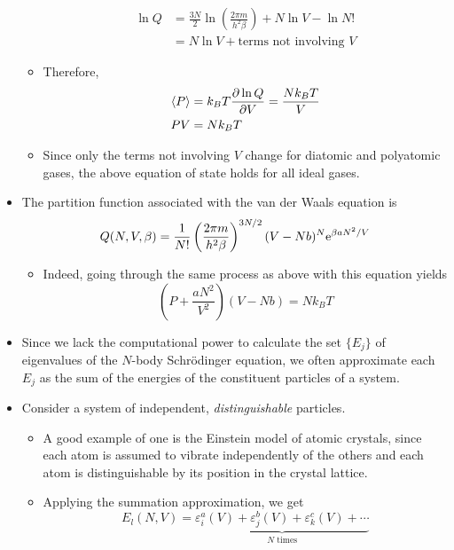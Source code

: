 \documentclass[../notes.tex]{subfiles}
\begin{document}
\begin{itemize}
\begin{itemize}
        \begin{align*}
            \ln Q &= \frac{3N}{2}\ln\left( \frac{2\pi m}{h^2\beta} \right)+N\ln V-\ln N!\\
            &= N\ln V+\text{terms not involving }V
        \end{align*}
        \item Therefore,
        \begin{align*}
            \prb{P} &= k_BT\pdv{\ln Q}{V} = \frac{Nk_BT}{V}\\
            PV &= Nk_BT
        \end{align*}
        \item Since only the terms not involving $V$ change for diatomic and polyatomic gases, the above equation of state holds for all ideal gases.
    \end{itemize}
    \item The partition function associated with the van der Waals equation is
    \begin{equation*}
        Q(N,V,\beta) = \frac{1}{N!}\left( \frac{2\pi m}{h^2\beta} \right)^{3N/2}(V-Nb)^N\e[\beta aN^2/V]
    \end{equation*}
    \begin{itemize}
        \item Indeed, going through the same process as above with this equation yields
        \begin{equation*}
            \left( P+\frac{aN^2}{V^2} \right)(V-Nb) = Nk_BT
        \end{equation*}
    \end{itemize}
    \item Since we lack the computational power to calculate the set $\{E_j\}$ of eigenvalues of the $N$-body Schr\"{o}dinger equation, we often approximate each $E_j$ as the sum of the energies of the constituent particles of a system.
    \item Consider a system of independent, \emph{distinguishable} particles.
    \begin{itemize}
        \item A good example of one is the Einstein model of atomic crystals, since each atom is assumed to vibrate independently of the others and each atom is distinguishable by its position in the crystal lattice.
        \item Applying the summation approximation, we get
        \begin{equation*}
            E_l(N,V) = \underbrace{\varepsilon_i^a(V)+\varepsilon_j^b(V)+\varepsilon_k^c(V)+\cdots}_{N\text{ times}}

\end{equation*}
\end{itemize}
\end{itemize}
\end{document}
